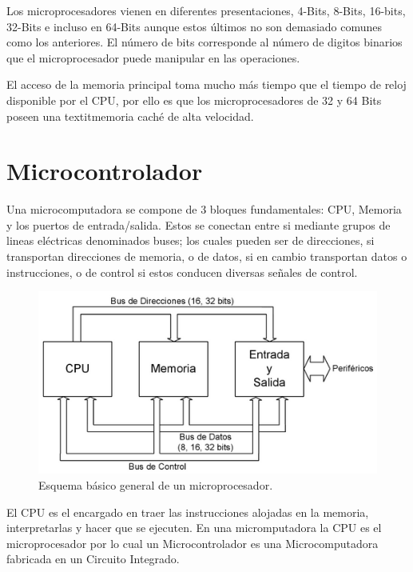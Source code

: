 \documentclass[letterpaper,12pt,oneside]{book}
\begin{document}
		Los microprocesadores vienen en diferentes presentaciones, 4-Bits, 8-Bits, 16-bits, 32-Bits e incluso en 64-Bits aunque estos últimos no son demasiado comunes como los anteriores. El número de bits corresponde al número de digitos binarios que el microprocesador puede manipular en las operaciones.

		El acceso de la memoria principal toma mucho más tiempo que el tiempo de reloj disponible por el CPU, por ello es que los microprocesadores de 32 y 64 Bits poseen una textit{memoria caché} de alta velocidad.
		\section{Microcontrolador}
		Una microcomputadora se compone de 3 bloques fundamentales: CPU, Memoria y los puertos de entrada/salida. Estos se conectan entre si mediante grupos de lineas eléctricas denominados buses; los cuales pueden ser de direcciones, si transportan direcciones de memoria, o de datos, si en cambio transportan datos o instrucciones, o de control si estos conducen diversas señales de control.

		\begin{figure}[!htpb]
			\centering
			\includegraphics[scale = 1.0]{Material de Consulta/EsqMicro.PNG}
			\caption[Esquema básico general de un microprocesador]{Esquema básico general de un microprocesador.}
			\label{EsqMicro}
		\end{figure}

		El CPU es el encargado en traer las instrucciones alojadas en la memoria, interpretarlas y hacer que se ejecuten. En una micromputadora la CPU es el microprocesador por lo cual un Microcontrolador es una Microcomputadora fabricada en un Circuito Integrado.
\end{document}
